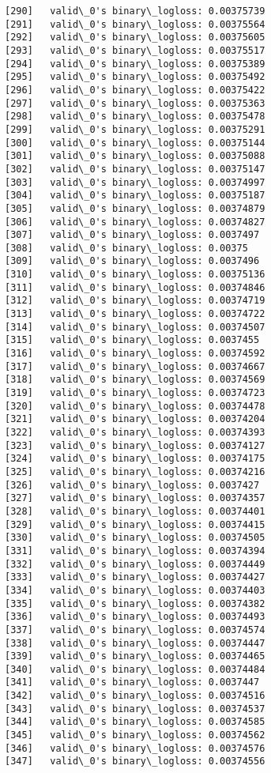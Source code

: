 \documentclass[11pt]{article}
\begin{document}
\begin{Verbatim}[commandchars=\\\{\}]
[290]	valid\_0's binary\_logloss: 0.00375739
[291]	valid\_0's binary\_logloss: 0.00375564
[292]	valid\_0's binary\_logloss: 0.00375605
[293]	valid\_0's binary\_logloss: 0.00375517
[294]	valid\_0's binary\_logloss: 0.00375389
[295]	valid\_0's binary\_logloss: 0.00375492
[296]	valid\_0's binary\_logloss: 0.00375422
[297]	valid\_0's binary\_logloss: 0.00375363
[298]	valid\_0's binary\_logloss: 0.00375478
[299]	valid\_0's binary\_logloss: 0.00375291
[300]	valid\_0's binary\_logloss: 0.00375144
[301]	valid\_0's binary\_logloss: 0.00375088
[302]	valid\_0's binary\_logloss: 0.00375147
[303]	valid\_0's binary\_logloss: 0.00374997
[304]	valid\_0's binary\_logloss: 0.00375187
[305]	valid\_0's binary\_logloss: 0.00374879
[306]	valid\_0's binary\_logloss: 0.00374827
[307]	valid\_0's binary\_logloss: 0.0037497
[308]	valid\_0's binary\_logloss: 0.00375
[309]	valid\_0's binary\_logloss: 0.0037496
[310]	valid\_0's binary\_logloss: 0.00375136
[311]	valid\_0's binary\_logloss: 0.00374846
[312]	valid\_0's binary\_logloss: 0.00374719
[313]	valid\_0's binary\_logloss: 0.00374722
[314]	valid\_0's binary\_logloss: 0.00374507
[315]	valid\_0's binary\_logloss: 0.0037455
[316]	valid\_0's binary\_logloss: 0.00374592
[317]	valid\_0's binary\_logloss: 0.00374667
[318]	valid\_0's binary\_logloss: 0.00374569
[319]	valid\_0's binary\_logloss: 0.00374723
[320]	valid\_0's binary\_logloss: 0.00374478
[321]	valid\_0's binary\_logloss: 0.00374204
[322]	valid\_0's binary\_logloss: 0.00374393
[323]	valid\_0's binary\_logloss: 0.00374127
[324]	valid\_0's binary\_logloss: 0.00374175
[325]	valid\_0's binary\_logloss: 0.00374216
[326]	valid\_0's binary\_logloss: 0.0037427
[327]	valid\_0's binary\_logloss: 0.00374357
[328]	valid\_0's binary\_logloss: 0.00374401
[329]	valid\_0's binary\_logloss: 0.00374415
[330]	valid\_0's binary\_logloss: 0.00374505
[331]	valid\_0's binary\_logloss: 0.00374394
[332]	valid\_0's binary\_logloss: 0.00374449
[333]	valid\_0's binary\_logloss: 0.00374427
[334]	valid\_0's binary\_logloss: 0.00374403
[335]	valid\_0's binary\_logloss: 0.00374382
[336]	valid\_0's binary\_logloss: 0.00374493
[337]	valid\_0's binary\_logloss: 0.00374574
[338]	valid\_0's binary\_logloss: 0.00374447
[339]	valid\_0's binary\_logloss: 0.00374465
[340]	valid\_0's binary\_logloss: 0.00374484
[341]	valid\_0's binary\_logloss: 0.0037447
[342]	valid\_0's binary\_logloss: 0.00374516
[343]	valid\_0's binary\_logloss: 0.00374537
[344]	valid\_0's binary\_logloss: 0.00374585
[345]	valid\_0's binary\_logloss: 0.00374562
[346]	valid\_0's binary\_logloss: 0.00374576
[347]	valid\_0's binary\_logloss: 0.00374556

\end{Verbatim}
\end{document}
